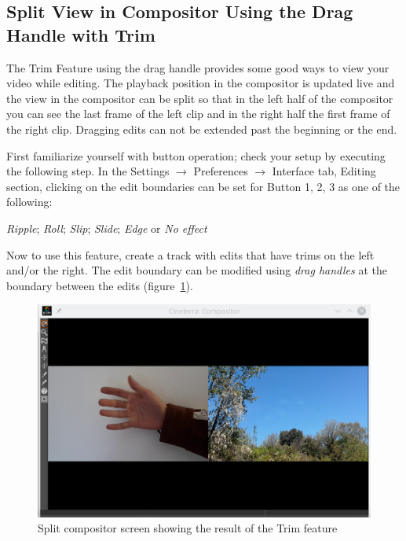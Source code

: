 \subsection{Split View in Compositor Using the Drag Handle with Trim}%
\label{sub:split_view_compositor_using_drag_trim}

The Trim Feature using the drag handle provides some good ways to view your video while editing.  The playback position in the compositor is updated live and the view in the compositor can be split so that in the left half of the compositor you can see the last frame of the left clip and in the right half the first frame of the right clip.  Dragging edits can not be extended past the beginning or the end.

First familiarize yourself with button operation; check your setup by executing the following step.  In the Settings $\rightarrow$ Preferences $\rightarrow$ Interface tab, Editing section, clicking on the edit boundaries can be set for Button 1, 2, 3 as one of the following:

\textit{Ripple}; \textit{Roll}; \textit{Slip}; \textit{Slide}; \textit{Edge} or \textit{No effect}

Now to use this feature, create a track with edits that have trims on the left and/or the right. The edit boundary can be modified using \textit{drag handles} at the boundary between the edits (figure~\ref{fig:trim-display}).
\begin{figure}[htpb]
    \centering
    \includegraphics[width=0.9\linewidth]{images/trim-display.png}
    \caption{Split compositor screen showing the result of the Trim feature}
    \label{fig:trim-display}
\end{figure}

